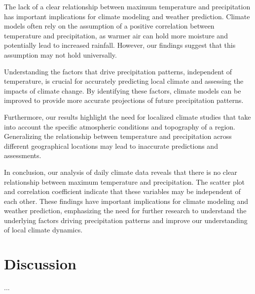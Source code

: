 \documentclass{article}
\begin{document}
The lack of a clear relationship between maximum temperature and precipitation has important implications for climate modeling and weather prediction. Climate models often rely on the assumption of a positive correlation between temperature and precipitation, as warmer air can hold more moisture and potentially lead to increased rainfall. However, our findings suggest that this assumption may not hold universally.

Understanding the factors that drive precipitation patterns, independent of temperature, is crucial for accurately predicting local climate and assessing the impacts of climate change. By identifying these factors, climate models can be improved to provide more accurate projections of future precipitation patterns.

Furthermore, our results highlight the need for localized climate studies that take into account the specific atmospheric conditions and topography of a region. Generalizing the relationship between temperature and precipitation across different geographical locations may lead to inaccurate predictions and assessments.

In conclusion, our analysis of daily climate data reveals that there is no clear relationship between maximum temperature and precipitation. The scatter plot and correlation coefficient indicate that these variables may be independent of each other. These findings have important implications for climate modeling and weather prediction, emphasizing the need for further research to understand the underlying factors driving precipitation patterns and improve our understanding of local climate dynamics.

\section{Discussion}
...
\end{document}
